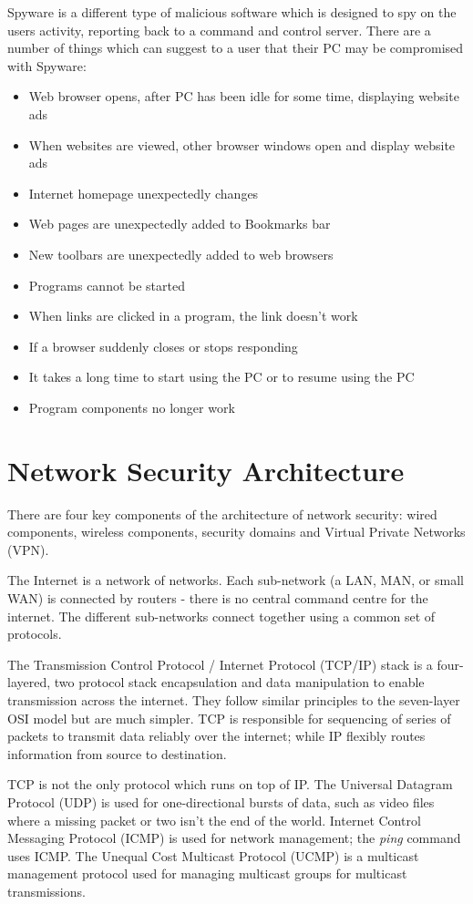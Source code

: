 Spyware is a different type of malicious software which is designed to spy on the users activity, reporting back to a command and control server. There are a number of things which can suggest to a user that their PC may be compromised with Spyware:
\begin{itemize}
    \item Web browser opens, after PC has been idle for some time, displaying website ads
    \item When websites are viewed, other browser windows open and display website ads
    \item Internet homepage unexpectedly changes
    \item Web pages are unexpectedly added to Bookmarks bar
    \item New toolbars are unexpectedly added to web browsers
    \item Programs cannot be started
    \item When links are clicked in a program, the link doesn't work
    \item If a browser suddenly closes or stops responding
    \item It takes a long time to start using the PC or to resume using the PC
    \item Program components no longer work
\end{itemize}

\section{Network Security Architecture}
There are four key components of the architecture of network security: wired components, wireless components, security domains and Virtual Private Networks (VPN). 

The Internet is a network of networks. Each sub-network (a LAN, MAN, or small WAN) is connected by routers - there is no central command centre for the internet. The different sub-networks connect together using a common set of protocols.

The Transmission Control Protocol / Internet Protocol (TCP/IP) stack is a four-layered, two protocol stack encapsulation and data manipulation to enable transmission across the internet. They follow similar principles to the seven-layer OSI model but are much simpler. TCP is responsible for sequencing of series of packets to transmit data reliably over the internet; while IP flexibly routes information from source to destination.

TCP is not the only protocol which runs on top of IP. The Universal Datagram Protocol (UDP) is used for one-directional bursts of data, such as video files where a missing packet or two isn't the end of the world. Internet Control Messaging Protocol (ICMP) is used for network management; the \textit{ping} command uses ICMP. The Unequal Cost Multicast Protocol (UCMP) is a multicast management protocol used for managing multicast groups for multicast transmissions. 

